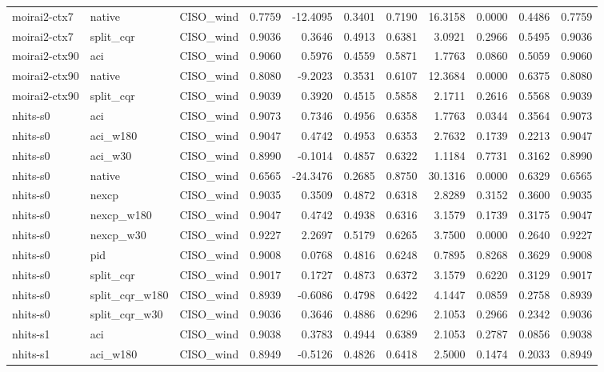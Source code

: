 \begin{tabular}{lllrrrrrrrr}
moirai2-ctx7 & native & CISO_wind & 0.7759 & -12.4095 & 0.3401 & 0.7190 & 16.3158 & 0.0000 & 0.4486 & 0.7759 \\
moirai2-ctx7 & split_cqr & CISO_wind & 0.9036 & 0.3646 & 0.4913 & 0.6381 & 3.0921 & 0.2966 & 0.5495 & 0.9036 \\
moirai2-ctx90 & aci & CISO_wind & 0.9060 & 0.5976 & 0.4559 & 0.5871 & 1.7763 & 0.0860 & 0.5059 & 0.9060 \\
moirai2-ctx90 & native & CISO_wind & 0.8080 & -9.2023 & 0.3531 & 0.6107 & 12.3684 & 0.0000 & 0.6375 & 0.8080 \\
moirai2-ctx90 & split_cqr & CISO_wind & 0.9039 & 0.3920 & 0.4515 & 0.5858 & 2.1711 & 0.2616 & 0.5568 & 0.9039 \\
nhits-s0 & aci & CISO_wind & 0.9073 & 0.7346 & 0.4956 & 0.6358 & 1.7763 & 0.0344 & 0.3564 & 0.9073 \\
nhits-s0 & aci_w180 & CISO_wind & 0.9047 & 0.4742 & 0.4953 & 0.6353 & 2.7632 & 0.1739 & 0.2213 & 0.9047 \\
nhits-s0 & aci_w30 & CISO_wind & 0.8990 & -0.1014 & 0.4857 & 0.6322 & 1.1184 & 0.7731 & 0.3162 & 0.8990 \\
nhits-s0 & native & CISO_wind & 0.6565 & -24.3476 & 0.2685 & 0.8750 & 30.1316 & 0.0000 & 0.6329 & 0.6565 \\
nhits-s0 & nexcp & CISO_wind & 0.9035 & 0.3509 & 0.4872 & 0.6318 & 2.8289 & 0.3152 & 0.3600 & 0.9035 \\
nhits-s0 & nexcp_w180 & CISO_wind & 0.9047 & 0.4742 & 0.4938 & 0.6316 & 3.1579 & 0.1739 & 0.3175 & 0.9047 \\
nhits-s0 & nexcp_w30 & CISO_wind & 0.9227 & 2.2697 & 0.5179 & 0.6265 & 3.7500 & 0.0000 & 0.2640 & 0.9227 \\
nhits-s0 & pid & CISO_wind & 0.9008 & 0.0768 & 0.4816 & 0.6248 & 0.7895 & 0.8268 & 0.3629 & 0.9008 \\
nhits-s0 & split_cqr & CISO_wind & 0.9017 & 0.1727 & 0.4873 & 0.6372 & 3.1579 & 0.6220 & 0.3129 & 0.9017 \\
nhits-s0 & split_cqr_w180 & CISO_wind & 0.8939 & -0.6086 & 0.4798 & 0.6422 & 4.1447 & 0.0859 & 0.2758 & 0.8939 \\
nhits-s0 & split_cqr_w30 & CISO_wind & 0.9036 & 0.3646 & 0.4886 & 0.6296 & 2.1053 & 0.2966 & 0.2342 & 0.9036 \\
nhits-s1 & aci & CISO_wind & 0.9038 & 0.3783 & 0.4944 & 0.6389 & 2.1053 & 0.2787 & 0.0856 & 0.9038 \\
nhits-s1 & aci_w180 & CISO_wind & 0.8949 & -0.5126 & 0.4826 & 0.6418 & 2.5000 & 0.1474 & 0.2033 & 0.8949 \\

\end{tabular}

